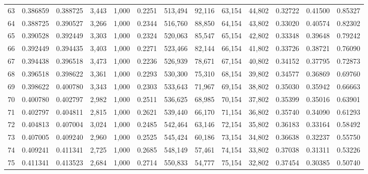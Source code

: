 \begin{tabular}{rrrrrrrrrrrrr}
63  &  0.386859 &  0.388725 &   3,443 &  1,000 &                                     0.2251 &  513,494 &   92,116 &   63,154 &   44,802 &  0.32722 &  0.41500 &  0.85327 \\
64  &  0.388725 &  0.390527 &   3,266 &  1,000 &                                     0.2344 &  516,760 &   88,850 &   64,154 &   43,802 &  0.33020 &  0.40574 &  0.82302 \\
65  &  0.390528 &  0.392449 &   3,303 &  1,000 &                                     0.2324 &  520,063 &   85,547 &   65,154 &   42,802 &  0.33348 &  0.39648 &  0.79242 \\
66  &  0.392449 &  0.394435 &   3,403 &  1,000 &                                     0.2271 &  523,466 &   82,144 &   66,154 &   41,802 &  0.33726 &  0.38721 &  0.76090 \\
67  &  0.394438 &  0.396518 &   3,473 &  1,000 &                                     0.2236 &  526,939 &   78,671 &   67,154 &   40,802 &  0.34152 &  0.37795 &  0.72873 \\
68  &  0.396518 &  0.398622 &   3,361 &  1,000 &                                     0.2293 &  530,300 &   75,310 &   68,154 &   39,802 &  0.34577 &  0.36869 &  0.69760 \\
69  &  0.398622 &  0.400780 &   3,343 &  1,000 &                                     0.2303 &  533,643 &   71,967 &   69,154 &   38,802 &  0.35030 &  0.35942 &  0.66663 \\
70  &  0.400780 &  0.402797 &   2,982 &  1,000 &                                     0.2511 &  536,625 &   68,985 &   70,154 &   37,802 &  0.35399 &  0.35016 &  0.63901 \\
71  &  0.402797 &  0.404811 &   2,815 &  1,000 &                                     0.2621 &  539,440 &   66,170 &   71,154 &   36,802 &  0.35740 &  0.34090 &  0.61293 \\
72  &  0.404813 &  0.407004 &   3,024 &  1,000 &                                     0.2485 &  542,464 &   63,146 &   72,154 &   35,802 &  0.36183 &  0.33164 &  0.58492 \\
73  &  0.407005 &  0.409240 &   2,960 &  1,000 &                                     0.2525 &  545,424 &   60,186 &   73,154 &   34,802 &  0.36638 &  0.32237 &  0.55750 \\
74  &  0.409241 &  0.411341 &   2,725 &  1,000 &                                     0.2685 &  548,149 &   57,461 &   74,154 &   33,802 &  0.37038 &  0.31311 &  0.53226 \\
75  &  0.411341 &  0.413523 &   2,684 &  1,000 &                                     0.2714 &  550,833 &   54,777 &   75,154 &   32,802 &  0.37454 &  0.30385 &  0.50740 \\

\end{tabular}
